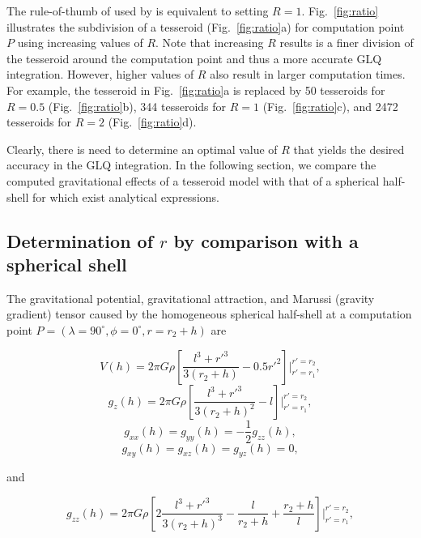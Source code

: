 \documentclass[extra]{gji}
\begin{document}
The rule-of-thumb of \citet{Ku1977}
used by \citet{Li2011}
is equivalent to setting $R=1$.
Fig.~\ref{fig:ratio}
illustrates the subdivision of a tesseroid
(Fig.~\ref{fig:ratio}a)
for computation point $P$
using increasing values of $R$.
Note that increasing $R$
results is a finer division of the tesseroid
around the computation point
and thus a more accurate GLQ integration.
However, higher values of $R$
also result in
larger computation times.
For example,
the tesseroid in Fig.~\ref{fig:ratio}a
is replaced by
50 tesseroids for $R=0.5$ (Fig.~\ref{fig:ratio}b),
344 tesseroids for $R=1$ (Fig.~\ref{fig:ratio}c),
and 2472 tesseroids for  $R=2$ (Fig.~\ref{fig:ratio}d).

Clearly,
there is need to determine
an optimal value of $R$
that yields the desired accuracy
in the GLQ integration.
In the following section,
we compare the computed gravitational effects
of a tesseroid model
with that of a spherical half-shell
for which exist analytical expressions.


\subsection{Determination of $r$ by comparison with a spherical shell}

The gravitational potential,
gravitational attraction,
and
Marussi (gravity gradient) tensor
caused by the homogeneous spherical half-shell
at a computation point
$P = (\lambda=90^\circ, \phi=0^\circ, r=r_2+h)$
are

\begin{equation}
    V(h) = 2\pi G \rho \left[
        \frac{l^3 + {r'}^3}{3(r_2 + h)} - 0.5 {r'}^2 \right]
         \Biggr|_{r'=r_1}^{r'=r_2},
    \label{eq:shellpot}
\end{equation}
\begin{equation}
    g_z(h) = 2\pi G \rho \left[
        \frac{l^3 + {r'}^3}{3(r_2 + h)^2} - l \right]
        \Biggr|_{r'=r_1}^{r'=r_2},
    \label{eq:shellgz}
\end{equation}
\begin{equation}
    g_{xx}(h) = g_{yy}(h) = -\frac{1}{2} g_{zz}(h),
\end{equation}
\begin{equation}
    g_{xy}(h) = g_{xz}(h) = g_{yz}(h) = 0,
\end{equation}

\noindent
and

\begin{equation}
    g_{zz}(h) = 2\pi G \rho \left[
        2\frac{l^3 + {r'}^3}{3(r_2 + h)^3}
        - \frac{l}{r_2 + h} + \frac{r_2 + h}{l}
        \right]
        \Biggr|_{r'=r_1}^{r'=r_2},
    \label{eq:shellgzz}
\end{equation}
\end{document}
